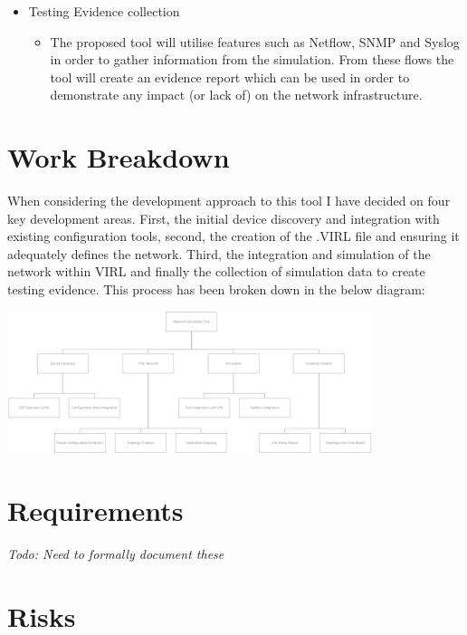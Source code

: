\documentclass[11pt]{report}
\begin{document}
\begin{itemize}
\begin{itemize}
  \end{itemize}
  \item{Testing Evidence collection}
  \begin{itemize}
    \item{The proposed tool will utilise features such as Netflow, SNMP and Syslog in order to gather information from the simulation. From these flows the tool will create an evidence report which can be used in order to demonstrate any impact (or lack of) on the network infrastructure.}
  \end{itemize}
\end{itemize}

\section{Work Breakdown}

When considering the development approach to this tool I have decided on four key development areas. First, the initial device discovery and integration with existing configuration tools, second, the creation of the .VIRL file and ensuring it adequately defines the network. Third, the integration and simulation of the network within VIRL and finally the collection of simulation data to create testing evidence. This process has been broken down in the below diagram:

\begin{center}
\includegraphics[width=0.8\textwidth]{Work-Breakdown.png}
\end{center}

\section{Requirements}

\textit{Todo: Need to formally document these}

\section{Risks}
\end{document}

